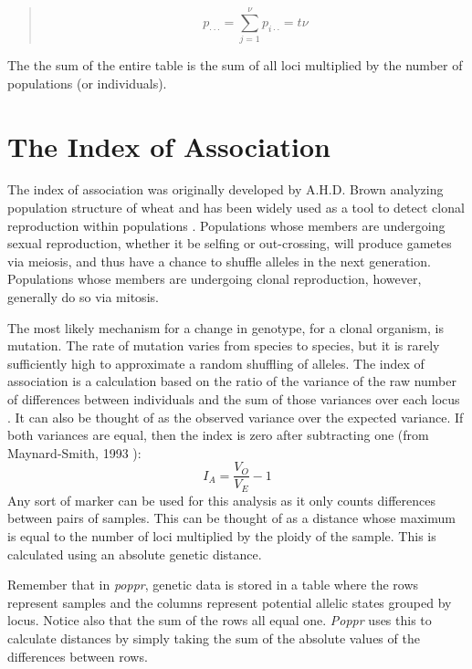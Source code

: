 \documentclass[letterpaper]{article}\usepackage[]{graphicx}\usepackage[]{color}
\newcommand{\poppr}{\textit{poppr}}
\newcommand{\Poppr}{\textit{Poppr}}
\begin{document}
\begin{quote} 
\begin{equation}
p_{{\cdot}{\cdot}\cdot}=\sum_{j=1}^{\nu}p_{i{\cdot}\cdot}=t\nu
\end{equation}
\end{quote}
The the sum of the entire table is the sum of all loci multiplied by the number 
of populations (or individuals).




\section{The Index of Association}
\label{indexassoc}

The index of association was originally developed by A.H.D. Brown analyzing
population structure of wheat and has been widely used as a tool to detect
clonal reproduction within populations \citep{Brown:1980, Smith:1993}.
Populations whose members are undergoing sexual reproduction, whether it be
selfing or out-crossing, will produce gametes via meiosis, and thus have a
chance to shuffle alleles in the next generation. Populations whose members are
undergoing clonal reproduction, however, generally do so via mitosis.

The most likely mechanism for a change in genotype, for a clonal organism, is 
mutation. The rate of mutation varies from species to species, but it is rarely
sufficiently high to approximate a random shuffling of alleles. The index of
association is a calculation based on the ratio of the variance of the raw
number of differences between individuals and the sum of those variances over
each locus \citep{Smith:1993}. It can also be thought of as the observed variance
over the expected variance. If both variances are equal, then the index is zero
after subtracting one (from Maynard-Smith, 1993 \citep{Smith:1993}):
\begin{equation}
\label{eq:I_A}
I_A = \frac{V_O}{V_E}-1
\end{equation}
Any sort of marker can be used for this analysis as it only counts differences
between pairs of samples. This can be thought of as a distance whose maximum is
equal to the number of loci multiplied by the ploidy of the sample. This is
calculated using an absolute genetic distance.

Remember that in \poppr{}, genetic data is stored in a table where the rows
represent samples and the columns represent potential allelic states grouped by
locus. Notice also that the sum of the rows all equal one. \Poppr{} uses this to
calculate distances by simply taking the sum of the absolute values of the
differences between rows.
\end{document}
